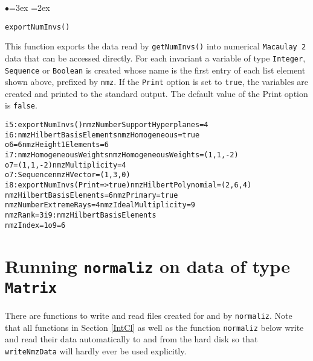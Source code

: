 \documentclass[11pt]{amsart}
\newenvironment{example}
  {\begin{alltt}\small}
  {\end{alltt}}
\newenvironment{functions}
  {\begin{list}{$\bullet$}{\leftmargin=3ex \labelwidth=2ex
  \listparindent=0pt \itemsep=6pt \parsep=3pt}}
  {\end{list}}
\begin{document}
\begin{functions}
\item\verb+exportNumInvs()+

This function exports the data read by \verb+getNumInvs()+ into
numerical \verb+Macaulay 2+ data that can be accessed directly. For
each invariant a variable of type \verb+Integer+, \verb+Sequence+ 
or \verb+Boolean+ is created whose name is the first entry of each 
list element shown above, prefixed by \verb+nmz+. If the \verb+Print+ 
option is set to {\tt true}, the variables are created and printed to 
the standard output. The default value of the Print option is {\tt false}.

\begin{example}
i5 : exportNumInvs()                nmzNumberSupportHyperplanes=4
i6 : nmzHilbertBasisElements        nmzHomogeneous=true
o6 = 6                              nmzHeight1Elements=6
i7 : nmzHomogeneousWeights          nmzHomogeneousWeights=(1,1,-2)
o7 = (1, 1, -2)                     nmzMultiplicity=4
o7 : Sequence                       nmzHVector=(1,3,0)
i8: exportNumInvs(Print=>true)      nmzHilbertPolynomial=(2,6,4)
nmzHilbertBasisElements=6           nmzPrimary=true
nmzNumberExtremeRays=4              nmzIdealMultiplicity=9
nmzRank=3                           i9 : nmzHilbertBasisElements
nmzIndex=1                          o9 = 6
\end{example}
    
\end{functions}

\section{Running {\tt normaliz} on data of type {\tt Matrix}}

There are functions to write and read files created for and by
{\tt normaliz}. Note that all functions in Section \ref{IntCl} as
well as the function {\tt normaliz} below write and read their
data automatically to and from the hard disk so that
\verb+writeNmzData+ will hardly ever be used explicitly.

\end{document}
